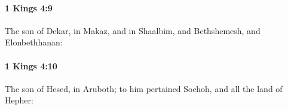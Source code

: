 		\paragraph{1 Kings 4:9} %
			\label{1KINGS-4-9}

			The son of Dekar, in Makaz, and in Shaalbim, and Bethshemesh, and Elonbethhanan:


		\paragraph{1 Kings 4:10} %
			\label{1KINGS-4-10}

			The son of Hesed, in Aruboth; to him pertained Sochoh, and all the land of Hepher:


